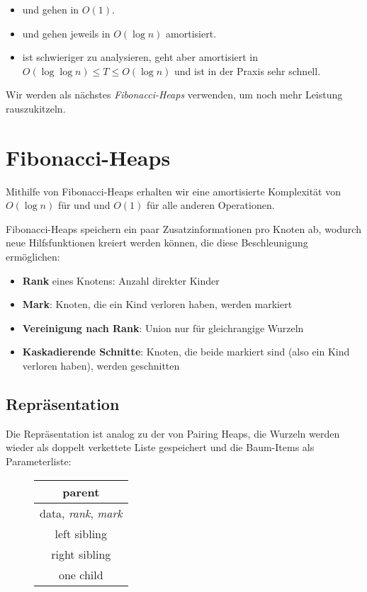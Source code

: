 \begin{itemize}
  \item {} und  gehen in \( O(1) \).
  \item {} und  gehen jeweils in \( O(\log n) \) amortisiert.
  \item {} ist schwieriger zu analysieren, geht aber amortisiert in \( O(\log\log n) \leq T \leq O(\log n) \) und ist in der Praxis sehr schnell.
\end{itemize}

Wir werden als nächstes \emph{Fibonacci-Heaps} verwenden, um noch mehr Leistung rauszukitzeln.

\section{Fibonacci-Heaps}

Mithilfe von Fibonacci-Heaps erhalten wir eine amortisierte Komplexität von \( O(\log n) \) für  und  und \( O(1) \) für alle anderen Operationen.

Fibonacci-Heaps speichern ein paar Zusatzinformationen pro Knoten ab, wodurch neue Hilfsfunktionen kreiert werden können, die diese Beschleunigung ermöglichen:

\begin{itemize}
  \item \textbf{Rank} eines Knotens: Anzahl direkter Kinder
  \item \textbf{Mark}: Knoten, die ein Kind verloren haben, werden markiert
  \item \textbf{Vereinigung nach Rank}: Union nur für gleichrangige Wurzeln
  \item \textbf{Kaskadierende Schnitte}: Knoten, die beide markiert sind (also ein Kind verloren haben), werden geschnitten
\end{itemize}

\subsection{Repräsentation}

\begin{minipage}{.725\textwidth}
  Die Repräsentation ist analog zu der von Pairing Heaps, die Wurzeln werden wieder als doppelt verkettete Liste gespeichert und die Baum-Items als Parameterliste:
\end{minipage}
\hfill
\begin{minipage}{.25\textwidth}
  \begin{figure}[H]
    \begin{tabular}{| c |}
      \hline
      parent \\
      \hline
      data, \emph{rank}, \emph{mark} \\
      \hline
      left sibling \\
      \hline
      right sibling \\
      \hline
      one child \\
      \hline
    \end{tabular}
  \end{figure}
\end{minipage}

